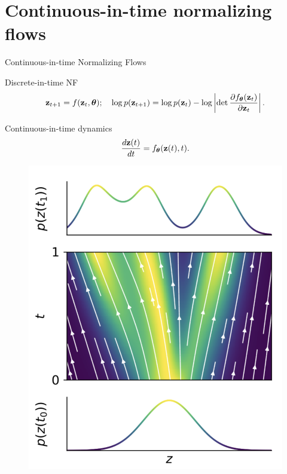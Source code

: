 \section{Continuous-in-time normalizing flows}
\begin{frame}{Continuous-in-time Normalizing Flows}
	\vspace{-0.3cm}
	\begin{block}{Discrete-in-time NF}
		\vspace{-0.8cm}
		  \[
		  \mathbf{z}_{t+1} = f(\mathbf{z}_t, \boldsymbol{\theta}); \quad \log p(\mathbf{z}_{t+1}) = \log p(\mathbf{z}_{t}) - \log \left| \det \frac{\partial f_{\boldsymbol{\theta}}(\mathbf{z}_t)}{\partial \mathbf{z}_{t}} \right| .
		  \]
		\vspace{-0.7cm}
	\end{block}
	\begin{block}{Continuous-in-time dynamics}
		\vspace{-0.2cm}
		\[
			\frac{d\mathbf{z}(t)}{dt} = f_{\boldsymbol{\theta}}(\mathbf{z}(t), t).
		\]
	\end{block}
	\vspace{-0.6cm}
	\begin{minipage}[t]{0.4\columnwidth}
		\begin{figure}
			\centering
			\includegraphics[width=0.75\linewidth]{figs/cnf_flow.png}
		\end{figure}
	\end{minipage}%
	\begin{minipage}[t]{0.6\columnwidth}
		\begin{figure}

\end{figure}
\end{minipage}
\end{frame}
